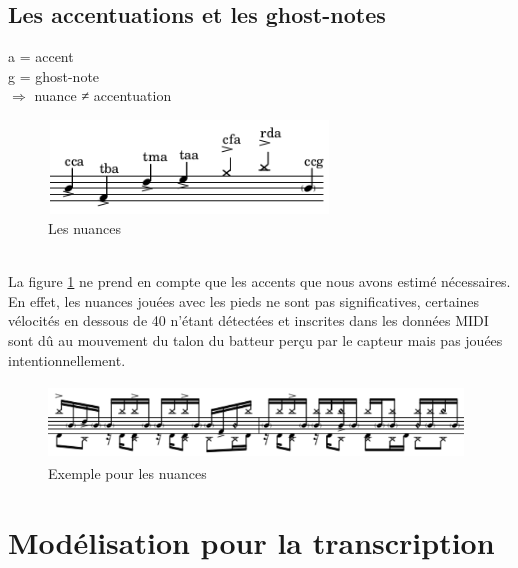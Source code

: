 \subsection*{Les accentuations et les ghost-notes}
a = accent\\
g = ghost-note\\
$\Rightarrow$ nuance ≠ accentuation
\begin{figure}[h]
	\centering
	\includegraphics[height=25mm, width=75mm]{z_images/3_methodes/0_notation_de_la_batterie/8_nuances_0.png}
	\caption{Les nuances}
	\label{nuances}
\end{figure}\\
La figure \ref{nuances} ne prend en compte que les accents que nous avons estimé nécessaires. En effet, les nuances jouées avec les pieds ne sont pas significatives, certaines vélocités en dessous de 40 n’étant détectées et inscrites dans les données MIDI sont dû au mouvement du talon du batteur perçu par le capteur mais pas jouées intentionnellement.
\begin{figure}[h]
	\centering
	\includegraphics[height=20mm, width=110mm]{z_images/3_methodes/0_notation_de_la_batterie/8_nuances_1.png}
	\caption{Exemple pour les nuances}
	\label{exemple_nuances}
\end{figure}
\section{Modélisation pour la transcription}
\label{modelisation_transcription}

